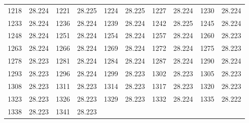 \documentclass[12pt]{ctexart}
\numberwithin{equation}{section}
\begin{document}
\begin{longtable}{cc|cc|cc|cc|cc}
    1218     & 28.224   & 1221     & 28.225   & 1224     & 28.225   & 1227     & 28.224   & 1230     & 28.224   \\
    1233     & 28.224   & 1236     & 28.224   & 1239     & 28.224   & 1242     & 28.225   & 1245     & 28.224   \\
    1248     & 28.224   & 1251     & 28.224   & 1254     & 28.224   & 1257     & 28.224   & 1260     & 28.223   \\
    1263     & 28.224   & 1266     & 28.224   & 1269     & 28.224   & 1272     & 28.224   & 1275     & 28.223   \\
    1278     & 28.223   & 1281     & 28.224   & 1284     & 28.224   & 1287     & 28.224   & 1290     & 28.224   \\
    1293     & 28.223   & 1296     & 28.224   & 1299     & 28.223   & 1302     & 28.223   & 1305     & 28.223   \\
    1308     & 28.223   & 1311     & 28.223   & 1314     & 28.223   & 1317     & 28.223   & 1320     & 28.223   \\
    1323     & 28.223   & 1326     & 28.223   & 1329     & 28.223   & 1332     & 28.224   & 1335     & 28.222   \\
    1338     & 28.223   & 1341     & 28.223   &          &          &          &          &          &          \\
\end{longtable}
\end{document}
